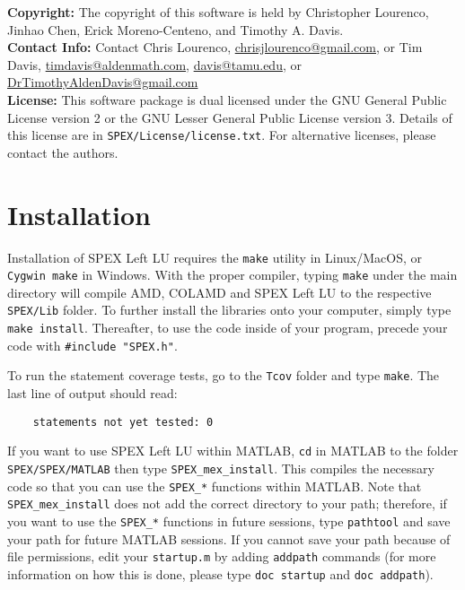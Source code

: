 \documentclass[12pt]{report}
\theoremstyle{definition}
\begin{document}
\textbf{Copyright:} The copyright of this software is held by  Christopher Lourenco, Jinhao Chen, Erick Moreno-Centeno, and Timothy A. Davis.\\

\noindent \textbf{Contact Info:} Contact Chris Lourenco,
\href{mailto:chrisjlourenco@gmail.com}{chrisjlourenco@gmail.com}, or Tim Davis,
\href{mailto:timdavis@aldenmath.com}{timdavis@aldenmath.com},
\href{mailto:davis@tamu.edu}{davis@tamu.edu}, or
\href{DrTimothyAldenDavis@gmail.com}{DrTimothyAldenDavis@gmail.com}\\

\noindent \textbf{License:} This software package is dual licensed under the GNU General Public License version 2 or the GNU Lesser General Public License version 3. Details of this license are in \verb|SPEX/License/license.txt|. For alternative licenses, please contact the authors.


\section{Installation} \label{s:install}

Installation of SPEX Left LU requires the \verb|make| utility in Linux/MacOS, or
\verb|Cygwin make| in Windows. With the proper compiler, typing \verb|make|
under the main directory will compile AMD, COLAMD and SPEX Left LU to the respective
\verb|SPEX/Lib| folder. To further install the libraries onto your computer,
simply type \verb|make install|.  Thereafter, to use the code inside of your
program, precede your code with \newline \verb|#include "SPEX.h"|.

To run the statement coverage tests, go to the \verb|Tcov| folder and
type \verb|make|.  The last line of output should read:

\begin{verbatim}
    statements not yet tested: 0
\end{verbatim}

If you want to use SPEX Left LU within MATLAB,
\verb|cd| in MATLAB to the folder \verb|SPEX/SPEX/MATLAB| then type
\newline \verb|SPEX_mex_install|. This compiles the necessary code so that you can use
the \verb|SPEX_*| functions within MATLAB. Note that
\newline \verb|SPEX_mex_install| does not add the correct directory to your path; therefore,
if you want to use the \verb|SPEX_*| functions in future sessions, type
\verb|pathtool| and save your path for future MATLAB sessions. If you cannot
save your path because of file permissions, edit your \verb|startup.m| by
adding \verb|addpath| commands (for more information on how this is done, please type \verb|doc startup| and \verb|doc addpath|).
\end{document}
